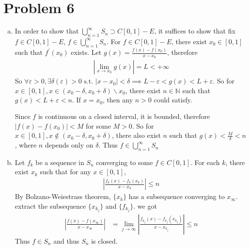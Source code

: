 \documentclass{report}
\def\ve{\varepsilon}
\def\abs#1{\left| #1 \right|}
\def\slash{\backslash{}}
\begin{document}
    \section*{Problem 6}
    \begin{enumerate}[(a)]
    \item

    In order to show that $\bigcup_{n=1}^\infty S_n \supset C[0, 1] - E$, it suffices to 
    show that fix $f \in C[0,1] - E$, $f \in \bigcup_{n=1}^\infty S_n$.
    For $f \in C[0,1]-E$, there exist $x_0 \in [0,1]$ such that $f^\prime(x_0)$ exists. 
    Let $g(x) = \frac{f(x) - f(x_0)}{x-x_0}$, therefore
    \begin{align*}
        \abs{\lim_{x \to x_0} g(x)} = L < +\infty
    \end{align*}
    So $\forall \ve > 0, \exists \delta(\ve) > 0 \text{ s.t. } |x-x_0| < \delta \implies 
    L - \ve < g(x) < L + \ve$. So for $x \in [0,1], x \in (x_0 - \delta, x_0 + \delta) \slash {x_0}$, 
    there exist $n \in \mathbb{N}$ such that $g(x) < L + \ve < n$. If $x = x_0$, then any 
    $n > 0$ could satisfy.

    Since $f$ is continuous on a closed interval, it is bounded, therefore $|f(x) - f(x_0)
    |< M$ for some $M > 0$. So for $x \in [0,1], x \notin (x_0 - \delta, x_0 + \delta)$,
    there also exist $n$ such that $g(x) < \frac{M}{\delta} < n$, where $n$ depends only
    on $\delta$. Thus $f \in \bigcup_{n=1}^\infty S_n$

    \item 
    Let $f_k$ be a sequence in $S_n$ converging to some $f \in C[0,1]$. 
    For each $k$, there exist $x_k$ such that for any $x \in [0,1]$,
    \begin{align*}
        \abs{\frac{f_k(x) - f_k(x_k)}{x - x_k}} \le n
    \end{align*}
    By Bolzano-Weiestrass theorem, $\{x_k\}$ has a subsequence converging to $x_\infty$.
    extract the subsequence $\{x_{k_j}\}$ and $\{f_{k_j}\}$. we got 
    \begin{align*}
        \abs{\frac{f(x) - f(x_\infty)}{x-x_\infty}} &=
            \lim_{j \to \infty} \abs{\frac{f_{k_j}(x) - f_{k_j}(x_{k_j})}{x - x_{k_j}}} \le n
    \end{align*}
    Thus $f \in S_n$ and thus $S_n$ is closed.


\end{enumerate}
\end{document}
